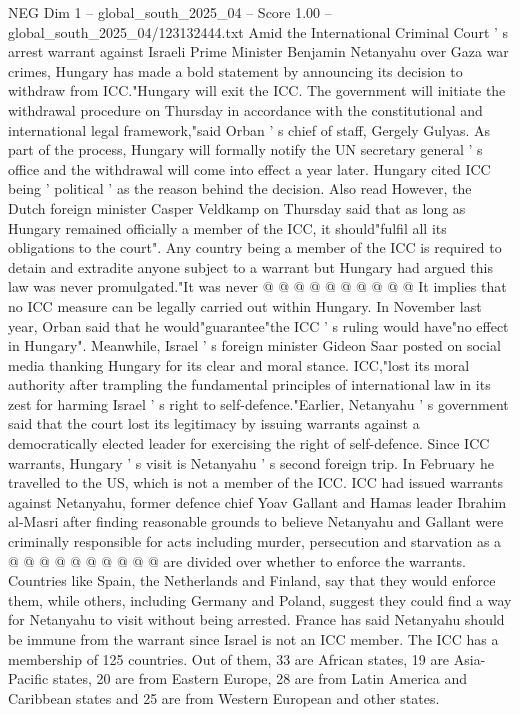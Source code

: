 \begin{textsample}{NEG Dim 1 – global\_south\_2025\_04 – Score 1.00 – global\_south\_2025\_04/123132444.txt}  \label{ex:f1_neg_127}
Amid the International Criminal Court ' s arrest warrant against Israeli Prime Minister Benjamin Netanyahu over Gaza war crimes, Hungary has made a bold statement by announcing its decision to withdraw from ICC."Hungary will exit the ICC.
The government will initiate the withdrawal procedure on Thursday in accordance with the constitutional and international legal framework,"said Orban ' s chief of staff, Gergely Gulyas.
As part of the process, Hungary will formally notify the UN secretary general ' s office and the withdrawal will come into effect a year later.
Hungary cited ICC being ' political ' as the reason behind the decision.
Also read However, the Dutch foreign minister Casper Veldkamp on Thursday said that as long as Hungary remained officially a member of the ICC, it should"fulfil all its obligations to the court".
Any country being a member of the ICC is required to detain and extradite anyone subject to a warrant but Hungary had argued this law was never promulgated."It was never @ @ @ @ @ @ @ @ @ @ It implies that no ICC measure can be legally carried out within Hungary.
In November last year, Orban said that he would"guarantee"the ICC ' s ruling would have"no effect in Hungary".
Meanwhile, Israel ' s foreign minister Gideon Saar posted on social media thanking Hungary for its clear and moral stance.
ICC,"lost its moral authority after trampling the fundamental principles of international law in its zest for harming Israel ' s right to self-defence."Earlier, Netanyahu ' s government said that the court lost its legitimacy by issuing warrants against a democratically elected leader for exercising the right of self-defence.
Since ICC warrants, Hungary ' s visit is Netanyahu ' s second foreign trip.
In February he travelled to the US, which is not a member of the ICC.
ICC had issued warrants against Netanyahu, former defence chief Yoav Gallant and Hamas leader Ibrahim al-Masri after finding reasonable grounds to believe Netanyahu and Gallant were criminally responsible for acts including murder, persecution and starvation as a @ @ @ @ @ @ @ @ @ @ are divided over whether to enforce the warrants.
Countries like Spain, the Netherlands and Finland, say that they would enforce them, while others, including Germany and Poland, suggest they could find a way for Netanyahu to visit without being arrested.
France has said Netanyahu should be immune from the warrant since Israel is not an ICC member.
The ICC has a membership of 125 countries.
Out of them, 33 are African states, 19 are Asia-Pacific states, 20 are from Eastern Europe, 28 are from Latin America and Caribbean states and 25 are from Western European and other states.

\end{textsample}
